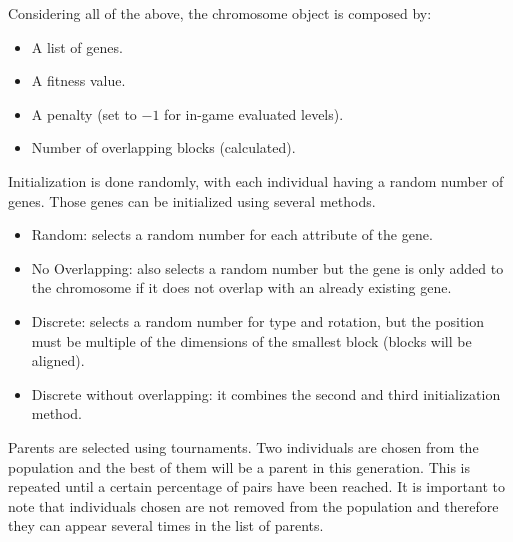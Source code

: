 \documentclass[runningheads,a4paper]{llncs}
\begin{document}
Considering all of the above, the chromosome object is composed by:
\begin{itemize}
	\item A list of genes.
	\item A fitness value.
	\item A penalty (set to $-1$ for in-game evaluated levels).
	\item Number of overlapping blocks (calculated).
\end{itemize}


Initialization is done randomly, with each individual having a random number of 
genes. Those genes can be initialized using several methods. 

\begin{itemize}
	\item Random: selects a random number for each attribute of the gene.
	\item No Overlapping: also selects a random number but the gene is only 
	added to the chromosome if it does not overlap with an already existing 
	gene.
	\item Discrete: selects a random number for type and rotation, but the 
	position must be multiple of the dimensions of the smallest block (blocks 
	will be aligned).
	\item Discrete without overlapping: it combines the second and third 
	initialization method.
\end{itemize}

Parents are selected using tournaments. Two individuals are chosen from the 
population and the best of them will be a parent in this generation. This is 
repeated until a certain percentage of pairs have been reached. It is important 
to note that individuals chosen are not removed from the population and 
therefore they can appear several times in the list of parents. 
\end{document}
